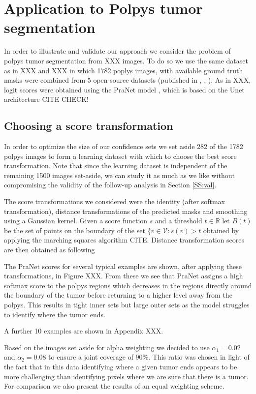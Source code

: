 \section{Application to Polpys tumor segmentation}
In order to illustrate and validate our approach we consider the problem of polpys tumor segmentation from XXX images. To do so we use the same dataset as in XXX and XXX in which 1782 poplys images, with available ground truth masks were combined from 5 open-source datasets (published in \cite{KVASIR2017}, \cite{Hyperkvasir2020} \cite{Bernal2012}, \cite{Silva2014}). As in XXX, logit scores were obtained using the PraNet model \cite{PraNet2020}, which is based on the Unet architecture CITE CHECK! 

\subsection{Choosing a score transformation}
In order to optimize the size of our confidence sets we set aside 282 of the 1782 polpys images to form a learning dataset with which to choose the best score transformation. Note that since the learning dataset is independent of the remaining 1500 images set-aside, we can study it as much as we like without compromising the validity of the follow-up analysis in Section \ref{SS:val}. 

The score transformations we considered were the identity (after softmax transformation), distance transformations of the predicted masks and smoothing using a Gaussian kernel. Given a score function $s$ and a threshold $t \in \mathbb{R}$ let $B(t)$ be the set of points on the boundary of the set $\lbrace v \in \mathcal{V}: s(v) > t$ obtained by applying the marching squares algorithm CITE. Distance transformation scores are then obtained as following


The PraNet scores for several typical examples are shown, after applying these transformations, in Figure XXX.  From these we see that PraNet assigns a high softmax score to the polpys regions which decreases in the regions directly around the  boundary of the tumor before returning to a higher level away from the polpys. This results in tight inner sets but large outer sets as the model struggles to identify where the tumor ends. 

A further 10 examples are shown in Appendix XXX. 

Based on the images set aside for alpha weighting we decided to use $\alpha_1 = 0.02$ and $\alpha_2 = 0.08$ to ensure a joint coverage of $90\%$. This ratio was chosen in light of the fact that in this data identifying where a given tumor ends appears to be more challenging than identifying pixels where we are sure that there is a tumor. For comparison we also present the results of an equal weighting scheme.



